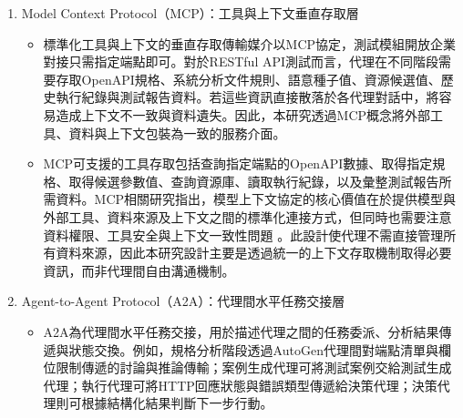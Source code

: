 \begin{ZhChapter}
\begin{enumerate}
  \begin{itemize}
    \item LangGraph以狀態式的工作流程控制管理整體測試流程的節點順序、條件分支、狀態保存、重試控制與終止條件。RESTful API測試並非單次請求即可完成，而是包含規格解析、測試策略制定、測試案例生成、請求實體化、HTTP執行、結果分析與報告輸出等多階段流程。這些階段需要明確的執行順序與狀態轉移，因此必須由確定性的流程引擎負責控制，而不應完全依賴代理對話自行推進。
    \item 主要任務包括定義各測試節點的執行順序、保存每一階段產生的中間狀態、限制多代理推理僅在指定節點內執行及確保整體流程具備可追蹤與可重播能力。換言之，LangGraph是整體系統的流程骨架，而不是語意推理核心。此設計呼應既有Agentic AI架構研究中對於流程協調、形式化狀態與可驗證工作流的重視 \parencite{Borghoff2025Beyond, Bandi2025Rise}。
    \item 在設計選擇上，相較於LangChain LCEL sequential chain或ReAct agent loop，本研究採用LangGraph StateGraph主要基於三項考量：其一，\texttt{WorkflowState}（TypedDict）作為跨節點共享狀態，所有節點對相同狀態物件讀寫，確保欄位型別一致性，避免多步驟間資料傳遞造成欄位遺漏或型別不符；其二，節點執行順序由圖結構靜態定義，確保測試流程具有確定性與可重播性，而非依賴代理自行推斷下一步行動；其三，條件邊（\texttt{add\_conditional\_edges}）使工作流程恢復層可根據API執行狀態選擇對應恢復分支，而不需將分支邏輯嵌入代理提示中，從而降低流程控制與語意推理之耦合。
  \end{itemize}
  \item Model Context Protocol（MCP）：工具與上下文垂直存取層
  \begin{itemize}
    \item 標準化工具與上下文的垂直存取傳輸媒介以MCP協定，測試模組開放企業對接只需指定端點即可。對於RESTful API測試而言，代理在不同階段需要存取OpenAPI規格、系統分析文件規則、語意種子值、資源候選值、歷史執行紀錄與測試報告資料。若這些資訊直接散落於各代理對話中，將容易造成上下文不一致與資料遺失。因此，本研究透過MCP概念將外部工具、資料與上下文包裝為一致的服務介面。
    \item MCP可支援的工具存取包括查詢指定端點的OpenAPI數據、取得指定規格、取得候選參數值、查詢資源庫、讀取執行紀錄，以及彙整測試報告所需資料。MCP相關研究指出，模型上下文協定的核心價值在於提供模型與外部工具、資料來源及上下文之間的標準化連接方式，但同時也需要注意資料權限、工具安全與上下文一致性問題 \parencite{Hou2025MCP, Ehtesham2025SurveyMCPACPA2AANP}。此設計使代理不需直接管理所有資料來源，因此本研究設計主要是透過統一的上下文存取機制取得必要資訊，而非代理間自由溝通機制。
  \end{itemize}
  \item Agent-to-Agent Protocol（A2A）：代理間水平任務交接層
  \begin{itemize}
    \item A2A為代理間水平任務交接，用於描述代理之間的任務委派、分析結果傳遞與狀態交換。例如，規格分析階段透過AutoGen代理間對端點清單與欄位限制傳遞的討論與推論傳輸；案例生成代理可將測試案例交給測試生成代理；執行代理可將HTTP回應狀態與錯誤類型傳遞給決策代理；決策代理則可根據結構化結果判斷下一步行動。
  \end{itemize}
\end{enumerate}


\end{ZhChapter}
